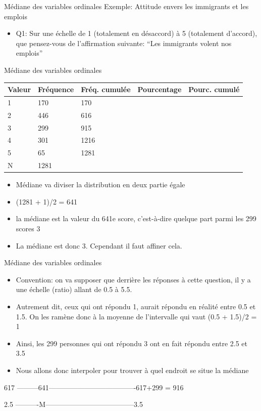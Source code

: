 \documentclass[
  ignorenonframetext,
]{beamer}
\providecommand{\tightlist}{%
  \setlength{\itemsep}{0pt}\setlength{\parskip}{0pt}}
\begin{document}
\begin{frame}{Médiane des variables ordinales}
\protect\hypertarget{muxe9diane-des-variables-ordinales}{}
Exemple: Attitude envers les immigrants et les emplois

\begin{itemize}
\tightlist
\item
  Q1: Sur une échelle de 1 (totalement en désaccord) à 5 (totalement
  d'accord), que pensez-vous de l'affirmation suivante: ``Les immigrants
  volent nos emplois''
\end{itemize}
\end{frame}

\begin{frame}{Médiane des variables ordinales}
\protect\hypertarget{muxe9diane-des-variables-ordinales-1}{}
\begin{longtable}[]{@{}llllc@{}}
\toprule()
Valeur & Fréquence & Fréq. cumulée & Pourcentage & Pourc. cumulé \\
\midrule()
\endhead
1 & 170 & 170 & & \\
2 & 446 & 616 & & \\
3 & 299 & 915 & & \\
4 & 301 & 1216 & & \\
5 & 65 & 1281 & & \\
N & 1281 & & & \\
\bottomrule()
\end{longtable}

\begin{itemize}
\tightlist
\item
  Médiane va diviser la distribution en deux partie égale
\item
  (1281 + 1)/2 = 641
\item
  la médiane est la valeur du 641e score, c'est-à-dire quelque part
  parmi les 299 scores 3
\item
  La médiane est donc 3. Cependant il faut affiner cela.
\end{itemize}
\end{frame}

\begin{frame}{Médiane des variables ordinales}
\protect\hypertarget{muxe9diane-des-variables-ordinales-2}{}
\begin{itemize}
\tightlist
\item
  Convention: on va supposer que derrière les réponses à cette question,
  il y a une échelle (ratio) allant de 0.5 à 5.5.
\item
  Autrement dit, ceux qui ont répondu 1, aurait répondu en réalité entre
  0.5 et 1.5. On les ramène donc à la moyenne de l'intervalle qui vaut
  (0.5 + 1.5)/2 = 1
\item
  Ainsi, les 299 personnes qui ont répondu 3 ont en fait répondu entre
  2.5 et 3.5
\item
  Nous allons donc interpoler pour trouver à quel endroit se situe la
  médiane
\end{itemize}

617 ---------641-------------------------------------617+299 = 916

2.5 ----------M--------------------------------------3.5
\end{frame}
\end{document}
